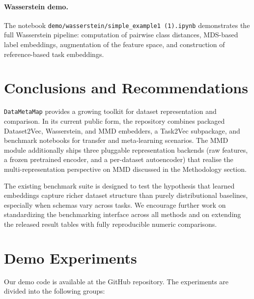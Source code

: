 \documentclass[peerreview]{IEEEtran}
\begin{document}
\paragraph{Wasserstein demo.}
The notebook \texttt{demo/wasserstein/simple\_example1 (1).ipynb}
demonstrates the full Wasserstein pipeline: computation of pairwise
class distances, MDS-based label embeddings, augmentation of the
feature space, and construction of reference-based task embeddings.

\section{Conclusions and Recommendations}
\texttt{DataMetaMap} provides a growing toolkit for dataset
representation and comparison. In its current public form, the
repository combines packaged Dataset2Vec, Wasserstein, and MMD
embedders, a Task2Vec subpackage, and benchmark notebooks for
transfer and meta-learning scenarios. The MMD module additionally
ships three pluggable representation backends (raw features, a
frozen pretrained encoder, and a per-dataset autoencoder) that
realise the multi-representation perspective on MMD discussed in the
Methodology section.

The existing benchmark suite is designed to test the hypothesis that
learned embeddings capture richer dataset structure than purely
distributional baselines, especially when schemas vary across tasks.
We encourage further work on standardizing the benchmarking interface
across all methods and on extending the released result tables with
fully reproducible numeric comparisons.

\appendices
\section{Demo Experiments}
Our demo code is available at the GitHub repository. The experiments
are divided into the following groups:
\end{document}
